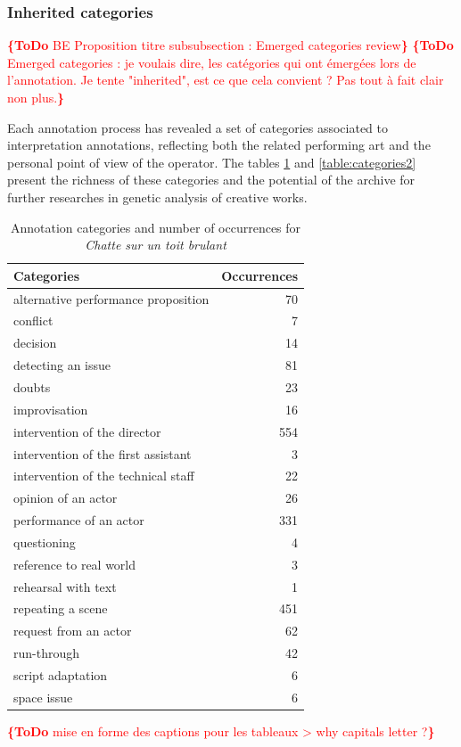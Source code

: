 \documentclass[conference]{IEEEtran}
\newcommand{\todo}[1]{\noindent\textcolor{red}{{\bf \{ToDo} #1{\bf \}}}}
\begin{document}
\subsubsection{Inherited categories}
\todo{BE Proposition titre subsubsection : Emerged categories review}
\todo{Emerged categories : je voulais dire, les catégories qui ont émergées lors de l'annotation. Je tente "inherited", est ce que cela convient ? Pas tout à fait clair non plus.}

Each annotation process has revealed a set of categories associated to interpretation annotations, reflecting both the related performing art and the personal point of view of the operator. The tables \ref{table:categories1} and \ref{table:categories2} present the richness of these categories and the potential of the archive for further researches in genetic analysis of creative works.

\begin{table}
\centering
\begin{tabular}{|p{4cm}|r|}
\hline 
Categories & Occurrences \\ 
\hline 
alternative performance proposition & 70 \\ 
\hline 
conflict & 7 \\ 
decision & 14 \\ 
\hline 
detecting an issue & 81 \\ 
\hline 
doubts & 23 \\ 
\hline 
improvisation & 16 \\ 
\hline 
intervention of the director & 554 \\ 
\hline 
intervention of the first assistant & 3 \\ 
\hline 
intervention of the technical staff & 22 \\ 
\hline 
opinion of an actor & 26 \\ 
\hline 
performance of an actor & 331 \\ 
\hline 
questioning & 4 \\ 
\hline 
reference to real world & 3 \\ 
\hline 
rehearsal with text & 1 \\ 
\hline 
repeating a scene & 451 \\ 
\hline 
request from an actor & 62 \\ 
\hline 
run-through & 42 \\ 
\hline 
script adaptation & 6 \\ 
\hline 
space issue & 6 \\ 
\hline 
\end{tabular}
\label{table:categories1}
\caption{Annotation categories and number of occurrences for \emph{Chatte sur un toit brulant}}
\end{table}
\todo{mise en forme des captions pour les tableaux > why capitals letter ?} 
\end{document}
